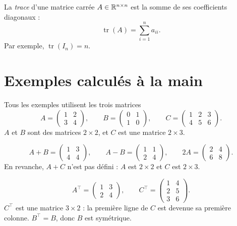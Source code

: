 \begin{definition}[Trace]
La \emph{trace} d'une matrice carrée
$A \in \mathbb{R}^{n \times n}$ est la somme de ses
coefficients diagonaux :
\[
    \operatorname{tr}(A) = \sum_{i=1}^{n} a_{ii}.
\]
Par exemple, $\operatorname{tr}(I_n) = n$.
\end{definition}

\section{Exemples calculés à la main}

Tous les exemples utilisent les trois matrices
\[
    A = \begin{pmatrix} 1 & 2 \\ 3 & 4 \end{pmatrix},
    \qquad
    B = \begin{pmatrix} 0 & 1 \\ 1 & 0 \end{pmatrix},
    \qquad
    C = \begin{pmatrix} 1 & 2 & 3 \\ 4 & 5 & 6 \end{pmatrix}.
\]
$A$ et $B$ sont des matrices $2 \times 2$, et $C$ est
une matrice $2 \times 3$.

\begin{example}
\[
    A + B = \begin{pmatrix} 1 & 3 \\ 4 & 4 \end{pmatrix},
    \qquad
    A - B = \begin{pmatrix} 1 & 1 \\ 2 & 4 \end{pmatrix},
    \qquad
    2A = \begin{pmatrix} 2 & 4 \\ 6 & 8 \end{pmatrix}.
\]
En revanche, $A + C$ n'est pas défini : $A$ est
$2 \times 2$ et $C$ est $2 \times 3$.
\end{example}

\begin{example}[Transposées]
\[
    A^\top = \begin{pmatrix} 1 & 3 \\ 2 & 4 \end{pmatrix},
    \qquad
    C^\top = \begin{pmatrix} 1 & 4 \\ 2 & 5 \\ 3 & 6 \end{pmatrix}.
\]
$C^\top$ est une matrice $3 \times 2$ : la première
ligne de $C$ est devenue sa première colonne.
$B^\top = B$, donc $B$ est symétrique.
\end{example}

